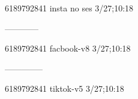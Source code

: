 6189792841 insta no ses
3/27;10:18


------------

6189792841 facbook-v8
3/27;10:18


--------------

6189792841 tiktok-v5
3/27;10:18
